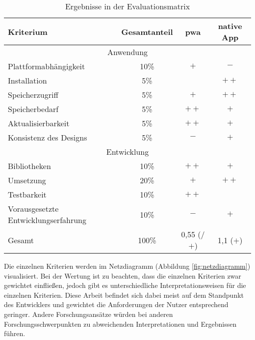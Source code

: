 \begin{table}[h!]
	\centering
	\begin{tabular}{|l|c|c|c|}
		\hline
		Kriterium              & Gesamtanteil & \cellcolor{green!25}\ac{pwa} & \cellcolor{blue!25} native App\\
		
		\hline
		\multicolumn{4}{c}{Anwendung}         \\
		\hline
		Plattformabhängigkeit   & 10\%         & \cellcolor{green!25}$+$ &\cellcolor{blue!25}$-$\\
		Installation           & 5\%          & \cellcolor{green!25}\Circle & \cellcolor{blue!25}$++$ \\
		Speicherzugriff        & 5\%          & \cellcolor{green!25}$+$&\cellcolor{blue!25}$++$ \\
		Speicherbedarf         & 5\%          &\cellcolor{green!25}$++$&\cellcolor{blue!25}$+$\\
		Aktualisierbarkeit     & 5\%          &\cellcolor{green!25}$++$&\cellcolor{blue!25}$+$ \\
		Konsistenz des Designs & 5\%         & \cellcolor{green!25}$-$&\cellcolor{blue!25}$+$\\
		
		\hline
		\multicolumn{4}{c}{Entwicklung}      \\
		\hline
		Bibliotheken           & 10\%         &\cellcolor{green!25}$++$&\cellcolor{blue!25}$+$ \\
		Umsetzung              & 20\%         &\cellcolor{green!25}$+$&\cellcolor{blue!25}$++$ \\
		Testbarkeit            & 10\%         &\cellcolor{green!25}$++$&\cellcolor{blue!25}\Circle\\
		Vorausgesetzte Entwicklungserfahrung    & 10\%  &\cellcolor{green!25}$-$&\cellcolor{blue!25}$+$ \\
		\hline
		\hline
		Gesamt                  & 100\%        & \cellcolor{green!25}0,55 (\Circle/$+$) &\cellcolor{blue!25}1,1 ($+$)\\
		\hline
	\end{tabular}
	\caption{Ergebnisse in der Evaluationsmatrix} \label{tab:evaluationsmatrix_ausgefüllt}
\end{table}

Die einzelnen Kriterien werden im Netzdiagramm (Abbildung \ref{fig:netzdiagramm}) visualisiert. Bei der Wertung ist zu beachten, dass die einzelnen Kriterien zwar gewichtet einfließen, jedoch gibt es unterschiedliche Interpretationsweisen für die einzelnen Kriterien. Diese Arbeit befindet sich dabei meist auf dem Standpunkt des Entwicklers und gewichtet die Anforderungen der Nutzer entsprechend geringer. Andere Forschungsansätze würden bei anderen Forschungsschwerpunkten zu abweichenden Interpretationen und Ergebnissen führen.


